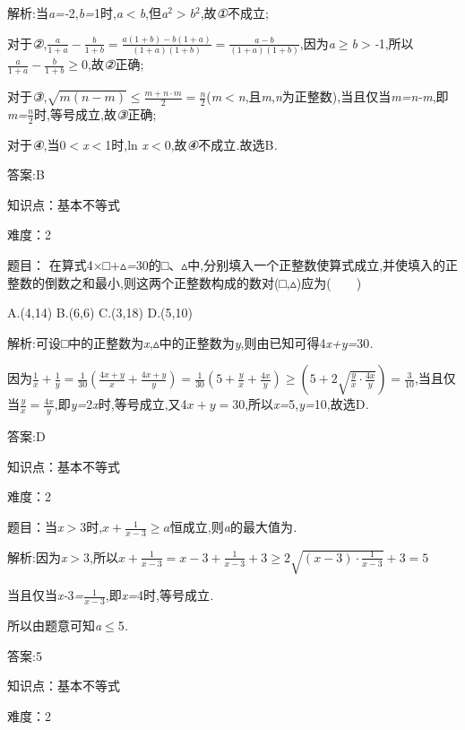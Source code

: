 \documentclass{article} %
\begin{document}
 解析:当\textit{a=-}2,\textit{b=}1时,\textit{a$<$b},但\textit{a}${}^{2}$\textit{$>$b}${}^{2}$,故\textit{①}不成立;

对于\textit{②},$\frac{a}{1+a}-\frac{b}{1+b}=\frac{a(1+b)-b(1+a)}{(1+a)(1+b)}=\frac{a-b}{(1+a)(1+b)}$,因为\textit{a}$\mathrm{\ge}$\textit{b$>$-}1,所以$\frac{a}{1+a}-\frac{b}{1+b}$$\mathrm{\ge}$0,故\textit{②}正确;

对于\textit{③},$\sqrt{m(n-m)} \le \frac{m+n\cdot m}{2}= \frac{n}{2}$(\textit{m$<$n},且\textit{m},\textit{n}为正整数),当且仅当\textit{m=n-m},即\textit{m=$\frac{n}{2}$}时,等号成立,故\textit{③}正确;

对于\textit{④},当0\textit{$<$x$<$}1时,ln \textit{x$<$}0,故\textit{④}不成立\textit{.}故选B\textit{.}

 答案:B

知识点：基本不等式

难度：2

 题目： 在算式4\textit{$\times$}□\textit{$+$}$\mathrm{\vartriangle}$\textit{=}30的□、$\mathrm{\vartriangle}$中,分别填入一个正整数使算式成立,并使填入的正整数的倒数之和最小,则这两个正整数构成的数对(□,$\mathrm{\vartriangle}$)应为(\textit{　　})

 A.(4,14) B.(6,6) C.(3,18) D.(5,10)

 解析:可设□中的正整数为\textit{x},$\mathrm{\vartriangle}$中的正整数为\textit{y},则由已知可得4\textit{x+y=}30\textit{.}

因为$\frac{1}{x}+\frac{1}{y}=\frac{1}{30}(\frac{4x+y}{x}+\frac{4x+y}{y})=\frac{1}{30}(5+\frac{y}{x}+\frac{4x}{y})\ge (5+2\sqrt{\frac{y}{x}\cdot \frac{4x}{y}})=\frac{3}{10}$,当且仅当$\frac{y}{x}=\frac{4x}{y}$,即\textit{y=}2\textit{x}时,等号成立,又4\textit{$x+y=$}30,所以\textit{x=}5,\textit{y=}10,故选D\textit{.}

 答案:D

知识点：基本不等式

难度：2

 题目：当\textit{x$>$}3时,$x+\frac{1}{x-3} \ge a$恒成立,则\textit{a}的最大值为\textit{\underbar{　　　　　}.~}

 解析:因为\textit{x$>$}3,所以$x+\frac{1}{x-3}=x-3+\frac{1}{x-3}+3 \ge 2\sqrt{(x-3)\cdot \frac{1}{x-3}}+3=5$

当且仅当\textit{x-}3\textit{=}$\frac{1}{x-3}$,即\textit{x=}4时,等号成立\textit{.}

所以由题意可知\textit{a}$\mathrm{\le}$5\textit{.}

 答案:5

知识点：基本不等式

难度：2
\end{document}
